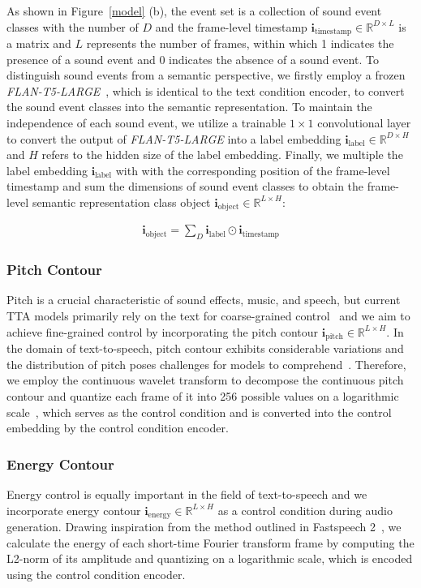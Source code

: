 \documentclass[letterpaper]{article}
\begin{document}
As shown in Figure~\ref{model} (b), the event set is a collection of sound event classes with the number of $D$ and the frame-level timestamp $\mathbf{i}_{\text{timestamp}} \in \mathbb{R}^{D \times L}$ is a matrix and $L$ represents the number of frames, within which 1 indicates the presence of a sound event and 0 indicates the absence of a sound event. To distinguish sound events from a semantic perspective, we firstly employ a frozen \textit{FLAN-T5-LARGE}~\cite{ghosal2023tango,chung2022siflm}, which is identical to the text condition encoder, to convert the sound event classes into the semantic representation. To maintain the independence of each sound event, we utilize a trainable $1 \times 1$ convolutional layer to convert the output of \textit{FLAN-T5-LARGE} into a label embedding $\mathbf{i}_{\text{label}} \in \mathbb{R}^{D \times H}$ and $H$ refers to the hidden size of the label embedding. Finally, we multiple the label embedding $\mathbf{i}_{\text{label}}$ with with the corresponding position of the frame-level timestamp and sum the dimensions of sound event classes to obtain the frame-level semantic representation class object $\mathbf{i}_{\text{object}} \in \mathbb{R}^{L \times H}$:

\begin{align}
\mathbf{i}_{\text{object}} = \sum_{D}{\mathbf{i}_{\text{label}} \odot \mathbf{i}_{\text{timestamp}}}
\end{align}

\subsubsection{Pitch Contour} Pitch is a crucial characteristic of sound effects, music, and speech, but current TTA models primarily rely on the text for coarse-grained control~\cite{liu2023audioldm} and we aim to achieve fine-grained control by incorporating the pitch contour $\mathbf{i}_{\text{pitch}} \in \mathbb{R}^{L \times H}$. In the domain of text-to-speech, pitch contour exhibits considerable variations and the distribution of pitch poses challenges for models to comprehend~\cite{ren2021fastspeech2}. Therefore, we employ the continuous wavelet transform to decompose the continuous pitch contour and quantize each frame of it into 256 possible values on a logarithmic scale~\cite{wuni2013wavelets,ren2021fastspeech2}, which serves as the control condition and is converted into the control embedding by the control condition encoder.

\subsubsection{Energy Contour} Energy control is equally important in the field of text-to-speech and we incorporate energy contour $\mathbf{i}_{\text{energy}} \in \mathbb{R}^{L \times H}$ as a control condition during audio generation. Drawing inspiration from the method outlined in Fastspeech 2~\cite{ren2021fastspeech2}, we calculate the energy of each short-time Fourier transform frame by computing the L2-norm of its amplitude and quantizing on a logarithmic scale, which is encoded using the control condition encoder.
\end{document}
